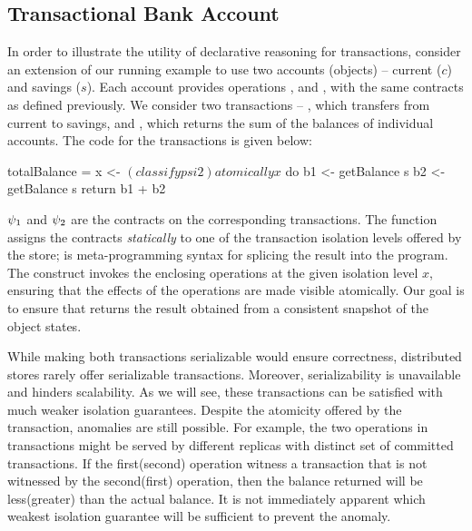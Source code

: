 \subsection{Transactional Bank Account}

In order to illustrate the utility of declarative reasoning for transactions,
consider an extension of our running example to use two accounts (objects) --
current ($c$) and savings ($s$). Each account provides operations
,  and , with the same contracts as
defined previously. We consider two transactions -- , which
transfers  from current to savings, and , which
returns the sum of the balances of individual accounts. The \name code for the
transactions is given below:
\vspace{-1em}

\noindent \begin{minipage}[t]{0.5\columnwidth}
\end{minipage}
\begin{minipage}[t]{0.5\columnwidth}
\begin{codehaskell}
totalBalance =
  x <- $(classify psi2)
  atomically x $ do
    b1 <- getBalance s
    b2 <- getBalance s
    return b1 + b2
\end{codehaskell}
\end{minipage}

\noindent $\psi_1$ and $\psi_2$ are the contracts on the corresponding
transactions. The function  assigns the contracts
\emph{statically} to one of the transaction isolation levels offered by the
store; \cf{\$()} is meta-programming syntax for splicing the result into the
program. The  construct invokes the enclosing operations at the
given isolation level $x$, ensuring that the effects of the operations are made
visible atomically. Our goal is to ensure that  returns the
result obtained from a consistent snapshot of the object states.

While making both transactions serializable would ensure correctness,
distributed stores rarely offer serializable transactions. Moreover,
serializability is unavailable and hinders scalability. As we will see, these
transactions can be satisfied with much weaker isolation guarantees. Despite
the atomicity offered by the transaction, anomalies are still possible. For
example, the two  operations in  transactions
might be served by different replicas with distinct set of committed 
transactions. If the first(second)  operation witness a
 transaction that is not witnessed by the second(first)
 operation, then the balance returned will be less(greater) than
the actual balance. It is not immediately apparent which weakest isolation
guarantee will be sufficient to prevent the anomaly.

